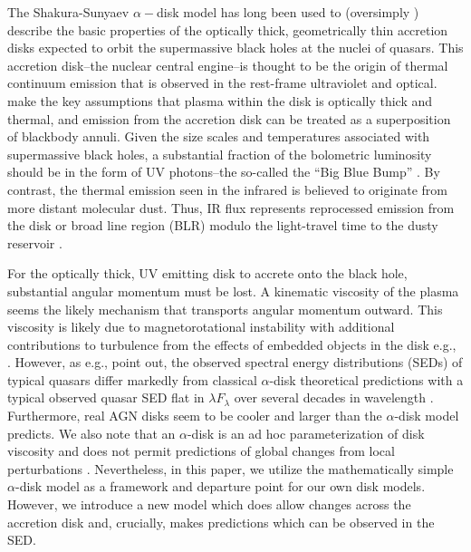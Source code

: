\documentclass{nature}
\begin{document}
The Shakura-Sunyaev $\alpha-$disk model \cite{SS73} has long been used
to (oversimply \cite{Lawrence2018}) describe the basic properties of
the optically thick, geometrically thin accretion disks expected to
orbit the supermassive black holes at the nuclei of quasars.  This
accretion disk--the nuclear central engine--is thought to be the
origin of thermal continuum emission that is observed in the
rest-frame ultraviolet and optical. \cite{SS73} make the key
assumptions that plasma within the disk is optically thick and
thermal, and emission from the accretion disk can be treated as a
superposition of blackbody annuli. Given the size scales and
temperatures associated with supermassive black holes, a substantial
fraction of the bolometric luminosity should be in the form of UV
photons--the so-called the ``Big Blue Bump'' \cite{Shields1978,
Malkan_Sargent1982}. By contrast, the thermal emission seen in the
infrared is believed to originate from more distant molecular dust.
Thus, IR flux represents reprocessed emission from the disk or broad
line region (BLR) modulo the light-travel time to the dusty reservoir
\citep[see ][for reviews]{Antonucci1993, Perlman2008, Lasota2016}.

For the optically thick, UV emitting disk to accrete onto the black
hole, substantial angular momentum must be lost.  A kinematic
viscosity of the plasma seems the likely mechanism that transports
angular momentum outward.  This viscosity is likely due to
magnetorotational instability \citep[MRI; ][]{Balbus_Hawley1991} with
additional contributions to turbulence from the effects of embedded
objects in the disk e.g., \cite{McKernan2014}.  However, as e.g.,
\cite{Koratkar_Blaes1999, Sirko_Goodman2003} point out, the observed
spectral energy distributions (SEDs) of typical quasars differ
markedly from classical $\alpha$-disk theoretical predictions
\citep[][]{SS73, Pringle1981} with a typical observed quasar SED flat
in $\lambda F_{\lambda}$ over several decades in wavelength
\citep{Elvis1994, Richards2006b}. Furthermore, real AGN disks seem to
be cooler \cite[e.g., ][]{Lawrence2012} and larger
\cite[e.g.,][]{Pooley2007, Morgan2010, Morgan2012, Mosquera2011} than
the $\alpha$-disk model predicts. We also note that an $\alpha$-disk
is an ad hoc parameterization of disk viscosity and does not permit
predictions of global changes from local perturbations
\cite{King2012}.  Nevertheless, in this paper, we utilize the
mathematically simple $\alpha$-disk model as a framework and departure
point for our own disk models. However, we introduce a new model which
does allow changes across the accretion disk and, crucially, makes
predictions which can be observed in the SED.
\end{document}
